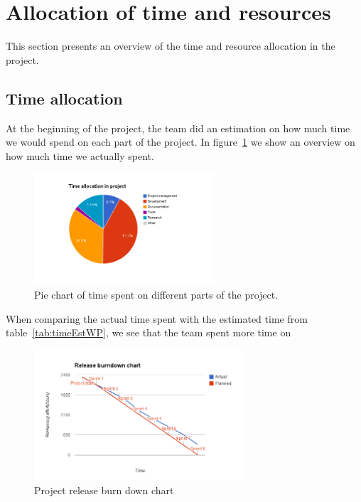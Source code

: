 \section{Allocation of time and resources}
\label{sec:timeSpent}
This section presents an overview of the time and resource allocation in the project.

\subsection{Time allocation}
At the beginning of the project, the team did an estimation on how much time we would spend on each part of the project. In figure~\ref{fig:piechart} we show an overview on how much time we actually spent.

\begin{figure}[H]
\centering
\includegraphics[width=0.6\textwidth, clip, trim=4cm 2cm 4cm 1cm]{ch/retrospect/fig/timePie.png}
\caption{Pie chart of time spent on different parts of the project.}
\label{fig:piechart}
\end{figure}

When comparing the actual time spent with the estimated time from table~\ref{tab:timeEstWP}, we see that the team spent more time on 

\begin{figure}[H]
\centering
\includegraphics[width=0.7\textwidth, clip, trim=1.1cm 0.5cm 1.2cm 1cm]{ch/retrospect/fig/release.png}
\caption{Project release burn down chart}
\label{fig:release}
\end{figure}

